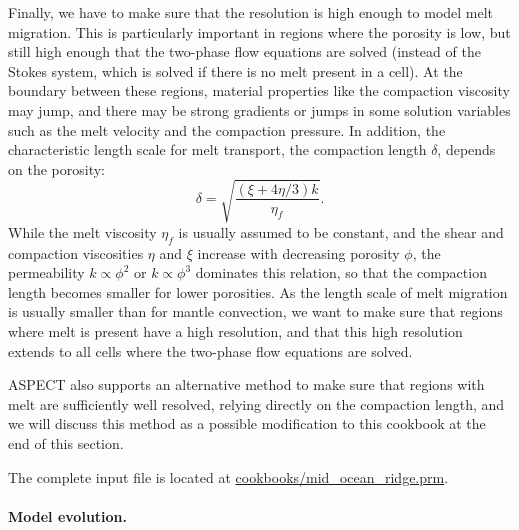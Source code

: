 \documentclass{article}
\newcommand{\aspect}{\textsc{ASPECT}}
\begin{document}


Finally, we have to make sure that the resolution is high enough to model melt migration. 
This is particularly important in regions where the porosity is low, but still high enough that 
the two-phase flow equations are solved (instead of the Stokes system, which is solved if there is  
no melt present in a cell). At the boundary between these regions, material properties like the 
compaction viscosity may jump, and there may be strong gradients or jumps in some solution variables such 
as the melt velocity and the compaction pressure. In addition, the characteristic length scale for melt transport, 
the compaction length $\delta$, depends on the porosity:
\begin{equation}
\delta = \sqrt{\frac{(\xi+4\eta/3)k}{\eta_f}}.
\end{equation}
While the melt viscosity $\eta_f$ is usually assumed to be constant, and the shear and compaction 
viscosities $\eta$ and  $\xi$ increase with decreasing porosity $\phi$, the permeability 
$k \propto \phi^2$ or $k \propto \phi^3$ dominates this relation, so that the compaction length becomes 
smaller for lower porosities. 
As the length scale of melt migration is usually smaller than for mantle convection, we want to make 
sure that regions where melt is present have a high resolution, and that this high resolution extends 
to all cells where the two-phase flow equations are solved. 



\aspect{} also supports an alternative method to make sure that regions with melt are sufficiently 
well resolved, relying directly on the compaction length, and we will discuss this method as a possible 
modification to this cookbook at the end of this section. 

The complete input file is located at \url{cookbooks/mid_ocean_ridge.prm}. 

\paragraph{Model evolution.}
\end{document}
